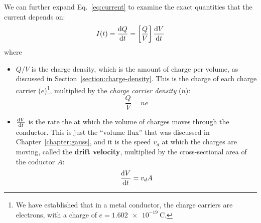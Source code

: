 We can further expand Eq.~\ref{eq:current} to examine the exact quantities that
the current depends on:
\begin{equation}
  I(t)=\diff Qt=\left[\frac QV\right]\diff Vt
\end{equation}
where
\begin{itemize}[itemsep=6pt]
\item $Q/V$ is the charge density, which is the amount of charge per volume,
  as discussed in Section~\ref{section:charge-density}. This is the charge of
  each charge carrier ($e$)\footnote{We have established that in a metal
  conductor, the charge carriers are electrons, with a charge of
  $e=\SI{1.602e-19}\coulomb$.}, multiplied by the \emph{charge carrier density}
  ($n$):
  \begin{equation*}
    \frac QV=ne
  \end{equation*}
  
\item $\diff Vt$ is the rate the at which the volume of charges moves through
  the conductor. This is just the ``volume flux'' that was discussed in
  Chapter~\ref{chapter:gauss}, and it is the speed $v_d$ at which the charges
  are moving, called the \textbf{drift velocity}, multiplied by the
  cross-sectional area of the coductor $A$:
  \begin{equation*}
    \diff Vt=v_dA
  \end{equation*}
  
\end{itemize}

